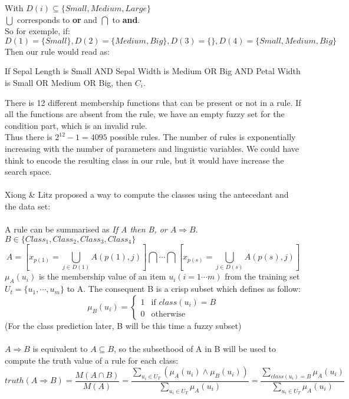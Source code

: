 \documentclass[a4paper,12pt]{article}
\begin{document}
With $D(i)\subseteq\{Small,Medium,Large\}$ \\
$\bigcup$ corresponds to \textbf{or} and $\bigcap$ to \textbf{and}.\\
So for exemple, if:
\[D(1)=\{Small\},D(2)=\{Medium,Big\},D(3)=\{\},D(4)=\{Small,Medium,Big\}\]
Then our rule would read as:
\begin{center}If Sepal Length is Small AND Sepal Width is Medium OR Big AND Petal Width is Small OR Medium OR Big, then $C_i$.\end{center} 
There is 12 different membership functions that can be present or not in a rule. If all the functions are absent from the rule, we have an empty fuzzy set for the condition part, which is an invalid rule.\\
Thus there is $2^{12}-1=4095$ possible rules. The number of rules is exponentially increasing with the number of parameters and linguistic variables. We could have think to encode the resulting class in our rule, but it would have increase the search space. \\ 
\\
Xiong \& Litz proposed a way to compute the classes using the antecedant and the data set: \\
\\
A rule can be summarised as \textit{If A then B, or $A\Rightarrow B$}.\\
$B\in \{Class_1,Class_2,Class_3,Class_4\}$\\
\[A=[x_{p(1)}=\bigcup_{j\in D(1)}A(p(1),j) ] \bigcap\cdots\bigcap[x_{p(s)}=\bigcup_{j\in D(s)}A(p(s),j)]\]
$\mu_A(u_i)$ is the membership value of an item $u_i(i=1\cdots m)$ from the training set $U_t=\{u_1,\cdots ,u_m\}$ to A.
The consequent B is a crisp subset which defines as follow:
\[\mu_B(u_i)=
\begin{cases}
	1 & \text{if $class(u_i)=B$}\\
	0 & \text{otherwise}
\end{cases}\]
(For the class prediction later, B will be this time a fuzzy subset)\\
\\
$A\Rightarrow B$ is equivalent to $A\subseteq B$, so the subsethood of A in B will be used to compute the truth value of a rule for each class:
\[
	truth(A\Rightarrow B)=
	\frac{M(A\cap B)}{M(A)}=
	\frac
		{\sum\limits_{u_i\in U_T}{(\mu_A(u_i)\land \mu_B(u_i))}}
		{\sum\limits_{u_i\in U_T}{\mu_A(u_i)}}=
	\frac
		{\sum\limits_{class(u_i)=B}{\mu_A(u_i)}}
		{\sum\limits_{u_i\in U_T}{\mu_A(u_i)}}
\]
\end{document}
